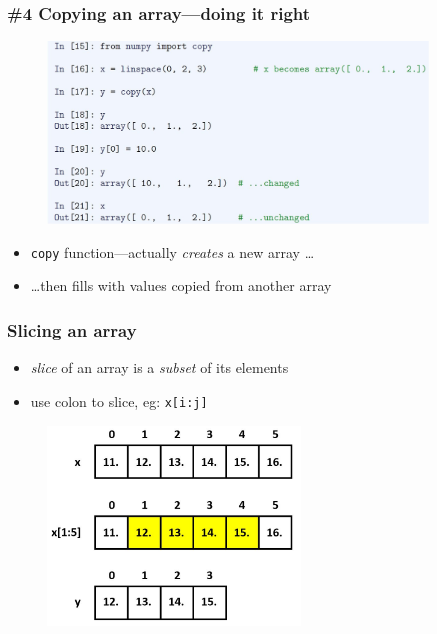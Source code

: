 \documentclass[14pt]{beamer}
\newcommand\red[1]{{\color{red} #1}}
\begin{document}
\begin{frame}[fragile]

\frametitle{\#4 Copying an array---doing it right}

\begin{figure}[ht]
	\centering
	\includegraphics[width=0.9\textwidth]{figures/LLp51a}
\end{figure}

\vspace*{-5mm}

\begin{itemize}
	\item \texttt{copy} function---actually \emph{creates} a new array \ldots
	\item[] \ldots then fills with values copied from another array
\end{itemize}

\end{frame}


\begin{frame}[fragile]

\frametitle{Slicing an array}

\begin{itemize}
	\item \red{\emph{slice}} of an array is a \emph{subset} of its elements
	\item use colon to slice, eg: \texttt{x[i:j]}
\end{itemize}

\begin{figure}[ht]
	\centering
	\includegraphics[width=0.6\textwidth]{figures/LLp51output}
\end{figure}

\end{frame}
\end{document}
